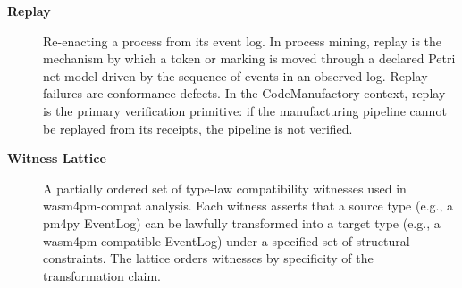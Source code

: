 {\begin{description}
  \item[\textbf{Replay}]
    Re-enacting a process from its event log. In process mining, replay
    is the mechanism by which a token or marking is moved through a declared
    Petri net model driven by the sequence of events in an observed log.
    Replay failures are conformance defects. In the CodeManufactory context,
    replay is the primary verification primitive: if the manufacturing pipeline
    cannot be replayed from its receipts, the pipeline is not verified.

  \item[\textbf{Witness Lattice}]
    A partially ordered set of type-law compatibility witnesses used in
    wasm4pm-compat analysis. Each witness asserts that a source type (e.g.,
    a pm4py EventLog) can be lawfully transformed into a target type (e.g.,
    a wasm4pm-compatible EventLog) under a specified set of structural
    constraints. The lattice orders witnesses by specificity of the
    transformation claim.

\end{description}
}
